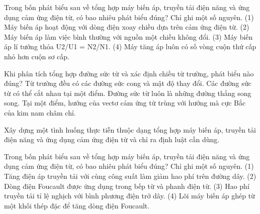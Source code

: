 \begin{ex}
Trong bốn phát biểu sau về tổng hợp máy biến áp, truyền tải điện năng và ứng dụng cảm ứng điện từ, có bao nhiêu phát biểu đúng? Chỉ ghi một số nguyên. (1) Máy biến áp hoạt động với dòng điện xoay chiều dựa trên cảm ứng điện từ. (2) Máy biến áp làm việc bình thường với nguồn một chiều không đổi. (3) Máy biến áp lí tưởng thỏa U2/U1 = N2/N1. (4) Máy tăng áp luôn có số vòng cuộn thứ cấp nhỏ hơn cuộn sơ cấp.
\end{ex}

\begin{ex}
Khi phân tích tổng hợp đường sức từ và xác định chiều từ trường, phát biểu nào đúng?
\choice
{Từ trường đều có các đường sức cong và mật độ thay đổi.}
{Các đường sức từ có thể cắt nhau tại một điểm.}
{Đường sức từ luôn là những đường thẳng song song.}
{\True Tại một điểm, hướng của vectơ cảm ứng từ trùng với hướng mà cực Bắc của kim nam châm chỉ.}
\end{ex}

\begin{bt}
Xây dựng một tình huống thực tiễn thuộc dạng tổng hợp máy biến áp, truyền tải điện năng và ứng dụng cảm ứng điện từ và chỉ ra định luật cần dùng.
\end{bt}

\begin{ex}
Trong bốn phát biểu sau về tổng hợp máy biến áp, truyền tải điện năng và ứng dụng cảm ứng điện từ, có bao nhiêu phát biểu đúng? Chỉ ghi một số nguyên. (1) Tăng điện áp truyền tải với cùng công suất làm giảm hao phí trên đường dây. (2) Dòng điện Foucault được ứng dụng trong bếp từ và phanh điện từ. (3) Hao phí truyền tải tỉ lệ nghịch với bình phương điện trở dây. (4) Lõi máy biến áp ghép từ một khối thép đặc để tăng dòng điện Foucault.
\end{ex}

